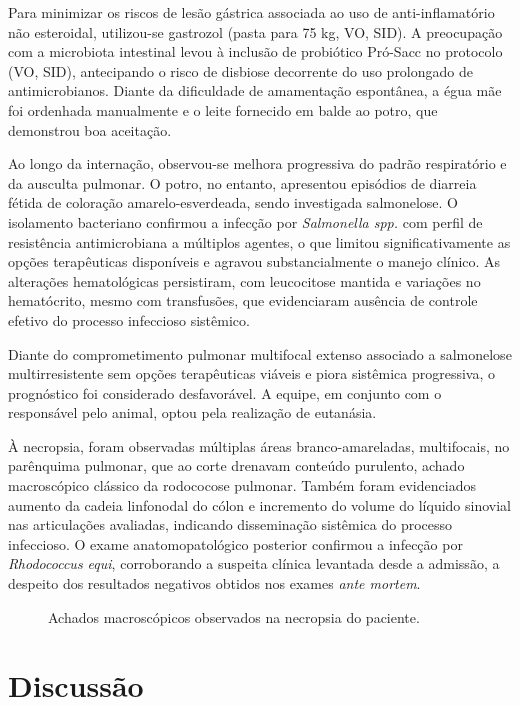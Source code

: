 Para minimizar os riscos de lesão gástrica associada ao uso de
anti-inflamatório não esteroidal, utilizou-se gastrozol (pasta para 75
kg, VO, SID). A preocupação com a microbiota intestinal levou à inclusão
de probiótico Pró-Sacc no protocolo (VO, SID), antecipando o risco de
disbiose decorrente do uso prolongado de antimicrobianos. Diante da
dificuldade de amamentação espontânea, a égua mãe foi ordenhada
manualmente e o leite fornecido em balde ao potro, que demonstrou boa
aceitação.

Ao longo da internação, observou-se melhora progressiva do padrão
respiratório e da ausculta pulmonar. O potro, no entanto, apresentou
episódios de diarreia fétida de coloração amarelo-esverdeada, sendo
investigada salmonelose. O isolamento bacteriano confirmou a infecção
por \textit{Salmonella spp.} com perfil de resistência antimicrobiana a
múltiplos agentes, o que limitou significativamente as opções
terapêuticas disponíveis e agravou substancialmente o manejo clínico. As
alterações hematológicas persistiram, com leucocitose mantida e
variações no hematócrito, mesmo com transfusões, que evidenciaram
ausência de controle efetivo do processo infeccioso sistêmico.

Diante do comprometimento pulmonar multifocal extenso associado a
salmonelose multirresistente sem opções terapêuticas viáveis e piora
sistêmica progressiva, o prognóstico foi considerado desfavorável. A
equipe, em conjunto com o responsável pelo animal, optou pela realização
de eutanásia.

À necropsia, foram observadas múltiplas áreas branco-amareladas,
multifocais, no parênquima pulmonar, que ao corte drenavam conteúdo
purulento, achado macroscópico clássico da rodococose pulmonar. Também
foram evidenciados aumento da cadeia linfonodal do cólon e incremento do
volume do líquido sinovial nas articulações avaliadas, indicando
disseminação sistêmica do processo infeccioso. O exame anatomopatológico
posterior confirmou a infecção por \textit{Rhodococcus equi}, corroborando
a suspeita clínica levantada desde a admissão, a despeito dos resultados
negativos obtidos nos exames \textit{ante mortem}.

\begin{figure}[htb]
  \centering
  \caption{Achados macroscópicos observados na necropsia do paciente.}
  \label{fig:necropsia}
\end{figure}

\section{Discussão}
\label{sec:discussao}


